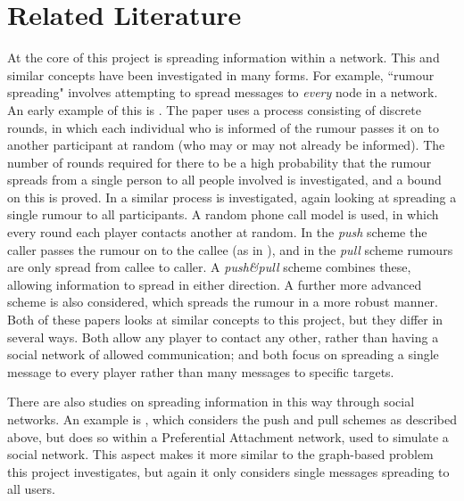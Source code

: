 \documentclass[bsc,frontabs,twoside,singlespacing,parskip,deptreport]{infthesis}     %
\begin{document}
\section{Related Literature}
At the core of this project is spreading information within a network. This and similar concepts have been investigated in many forms. For example, ``rumour spreading" involves attempting to spread messages to \textit{every} node in a network. An early example of this is \cite{Pittel87}. The paper uses a process consisting of discrete rounds, in which each individual who is informed of the rumour passes it on to another participant at random (who may or may not already be informed). The number of rounds required for there to be a high probability that the rumour spreads from a single person to all people involved is investigated, and a bound on this is proved. In \cite{KarpSSV00} a similar process is investigated, again looking at spreading a single rumour to all participants. A random phone call model is used, in which every round each player contacts another at random. In the \textit{push} scheme the caller passes the rumour on to the callee (as in \cite{Pittel87}), and in the \textit{pull} scheme rumours are only spread from callee to caller. A \textit{push\&pull} scheme combines these, allowing information to spread in either direction. A further more advanced scheme is also considered, which spreads the rumour in a more robust manner. Both of these papers looks at similar concepts to this project, but they differ in several ways. Both allow any player to contact any other, rather than having a social network of allowed communication; and both focus on spreading a single message to every player rather than many messages to specific targets.

There are also studies on spreading information in this way through social networks. An example is \cite{SocialNetworkRumours}, which considers the push and pull schemes as described above, but does so within a Preferential Attachment network, used to simulate a social network. This aspect makes it more similar to the graph-based problem this project investigates, but again it only considers single messages spreading to all users.
\end{document}
